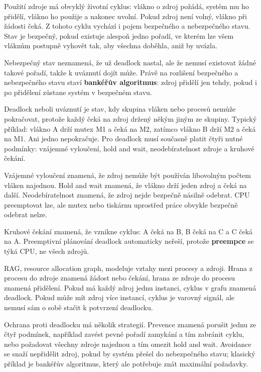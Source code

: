 Použití zdroje má obvyklý životní cyklus: vlákno o zdroj požádá, systém mu ho přidělí, vlákno ho použije a nakonec uvolní. Pokud zdroj není volný, vlákno při žádosti čeká. Z tohoto cyklu vychází i pojem bezpečného a nebezpečného stavu. Stav je bezpečný, pokud existuje alespoň jedno pořadí, ve kterém lze všem vláknům postupně vyhovět tak, aby všechna doběhla, aniž by uvázla.

Nebezpečný stav neznamená, že už deadlock nastal, ale že nemusí existovat žádné takové pořadí, takže k uváznutí dojít může. Právě na rozlišení bezpečného a nebezpečného stavu staví \textbf{bankéřův algoritmus}: zdroj přidělí jen tehdy, pokud i po přidělení zůstane systém v bezpečném stavu.

Deadlock neboli uváznutí je stav, kdy skupina vláken nebo procesů nemůže pokračovat, protože každý čeká na zdroj držený někým jiným ze skupiny. Typický příklad: vlákno A drží mutex M1 a čeká na M2, zatímco vlákno B drží M2 a čeká na M1. Ani jedno nepokračuje. Pro deadlock musí současně platit čtyři nutné podmínky: vzájemné vyloučení, hold and wait, neodebíratelnost zdroje a kruhové čekání.

Vzájemné vyloučení znamená, že zdroj nemůže být používán libovolným počtem vláken najednou. Hold and wait znamená, že vlákno drží jeden zdroj a čeká na další. Neodebíratelnost znamená, že zdroj nejde bezpečně násilně odebrat. CPU preemptovat lze, ale mutex nebo tiskárnu uprostřed práce obvykle bezpečně odebrat nelze.

Kruhové čekání znamená, že vznikne cyklus: A čeká na B, B čeká na C a C čeká na A. Preemptivní plánování deadlock automaticky neřeší, protože \textbf{preempce} se týká CPU, ne všech zdrojů.

RAG, resource allocation graph, modeluje vztahy mezi procesy a zdroji. Hrana z procesu do zdroje znamená žádost nebo čekání, hrana ze zdroje do procesu znamená přidělení. Pokud má každý zdroj jednu instanci, cyklus v grafu znamená deadlock. Pokud může mít zdroj více instancí, cyklus je varovný signál, ale nemusí sám o sobě stačit k potvrzení deadlocku.

Ochrana proti deadlocku má několik strategií. Prevence znamená porušit jednu ze čtyř podmínek, například zavést pevné pořadí zamykání a tím zabránit cyklu, nebo požadovat všechny zdroje najednou a tím omezit hold and wait. Avoidance se snaží nepřidělit zdroj, pokud by systém přešel do nebezpečného stavu; klasický příklad je bankéřův algoritmus, který ale potřebuje znát maximální požadavky.

